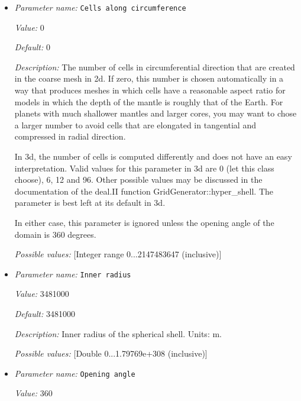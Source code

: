 \begin{itemize}
\item {\it Parameter name:} {\tt Cells along circumference}
\label{parameters:Geometry model/Spherical shell/Cells along circumference}


{\it Value:} 0


{\it Default:} 0


{\it Description:} The number of cells in circumferential direction that are created in the coarse mesh in 2d. If zero, this number is chosen automatically in a way that produces meshes in which cells have a reasonable aspect ratio for models in which the depth of the mantle is roughly that of the Earth. For planets with much shallower mantles and larger cores, you may want to chose a larger number to avoid cells that are elongated in tangential and compressed in radial direction.

In 3d, the number of cells is computed differently and does not have an easy interpretation. Valid values for this parameter in 3d are 0 (let this class choose), 6, 12 and 96. Other possible values may be discussed in the documentation of the deal.II function GridGenerator::hyper_shell. The parameter is best left at its default in 3d.

In either case, this parameter is ignored unless the opening angle of the domain is 360 degrees.


{\it Possible values:} [Integer range 0...2147483647 (inclusive)]
\item {\it Parameter name:} {\tt Inner radius}
\label{parameters:Geometry model/Spherical shell/Inner radius}


{\it Value:} 3481000


{\it Default:} 3481000


{\it Description:} Inner radius of the spherical shell. Units: m.


{\it Possible values:} [Double 0...1.79769e+308 (inclusive)]
\item {\it Parameter name:} {\tt Opening angle}
\label{parameters:Geometry model/Spherical shell/Opening angle}


{\it Value:} 360



\end{itemize}
